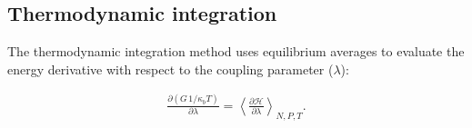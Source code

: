 \documentclass[
	12pt,				%
	openany,			%
	oneside,			%
	a4paper,			%
	english,			%
	brazil				%
	]{abntex2}
\begin{document}
\subsection{Thermodynamic integration}

The thermodynamic integration method \cite{kirkwood1935} uses equilibrium averages to evaluate the energy derivative with respect to the coupling parameter ($\lambda$): 
%
%
%



\begin{equation}
\label{eq:ti3}
\begin{aligned}
\frac{\partial (G \, 1/\kappa_{b}T) }{\partial \lambda} =  \left \langle \frac{\partial \mathcal{H}}{\partial \lambda} \right \rangle _{N,P,T} .
\end{aligned}
\end{equation}
\end{document}
